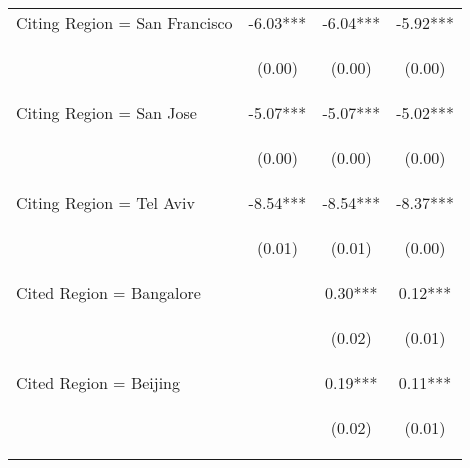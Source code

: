 \begin{center}
\begin{tabular}{lccc}
Citing Region = San Francisco & -6.03*** & -6.04*** & -5.92*** \\
\vspace{4pt} & \begin{footnotesize}(0.00)\end{footnotesize} & \begin{footnotesize}(0.00)\end{footnotesize} & \begin{footnotesize}(0.00)\end{footnotesize} \\
Citing Region = San Jose & -5.07*** & -5.07*** & -5.02*** \\
\vspace{4pt} & \begin{footnotesize}(0.00)\end{footnotesize} & \begin{footnotesize}(0.00)\end{footnotesize} & \begin{footnotesize}(0.00)\end{footnotesize} \\
Citing Region = Tel Aviv & -8.54*** & -8.54*** & -8.37*** \\
\vspace{4pt} & \begin{footnotesize}(0.01)\end{footnotesize} & \begin{footnotesize}(0.01)\end{footnotesize} & \begin{footnotesize}(0.00)\end{footnotesize} \\
Cited Region = Bangalore &  & 0.30*** & 0.12*** \\
\vspace{4pt} & \begin{footnotesize}\end{footnotesize} & \begin{footnotesize}(0.02)\end{footnotesize} & \begin{footnotesize}(0.01)\end{footnotesize} \\
Cited Region = Beijing &  & 0.19*** & 0.11*** \\
\vspace{4pt} & \begin{footnotesize}\end{footnotesize} & \begin{footnotesize}(0.02)\end{footnotesize} & \begin{footnotesize}(0.01)\end{footnotesize} \\

\end{tabular}
\end{center}
